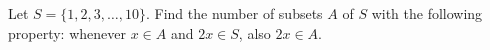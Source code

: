 Let $S=\{1,2,3,\dots,10\}$. Find the number of subsets $A$ of $S$ with the following property: whenever $x\in A$ and $2x\in S$, also $2x\in A$.
